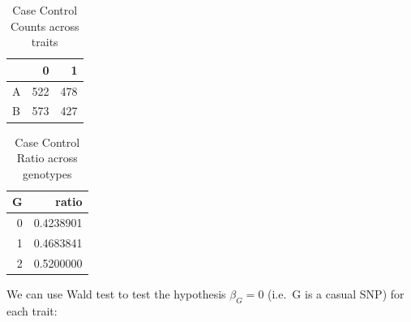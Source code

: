 \documentclass[
]{article}
\newenvironment{Shaded}{\begin{snugshade}}{\end{snugshade}}
\newcommand{\CommentTok}[1]{\textcolor[rgb]{0.56,0.35,0.01}{\textit{#1}}}
\newcommand{\DataTypeTok}[1]{\textcolor[rgb]{0.13,0.29,0.53}{#1}}
\newcommand{\DecValTok}[1]{\textcolor[rgb]{0.00,0.00,0.81}{#1}}
\newcommand{\KeywordTok}[1]{\textcolor[rgb]{0.13,0.29,0.53}{\textbf{#1}}}
\newcommand{\NormalTok}[1]{#1}
\newcommand{\OperatorTok}[1]{\textcolor[rgb]{0.81,0.36,0.00}{\textbf{#1}}}
\newcommand{\StringTok}[1]{\textcolor[rgb]{0.31,0.60,0.02}{#1}}
\begin{document}
\begin{table}[H]

\caption{\label{tab:simulatedData}Case Control Counts across traits}
\centering
\fontsize{10}{12}\selectfont
\begin{tabular}[t]{l|r|r}
\hline
  & 0 & 1\\
\hline
A & 522 & 478\\
\hline
B & 573 & 427\\
\hline
\end{tabular}
\end{table}

\begin{Shaded}
\end{Shaded}

\begin{table}[H]

\caption{\label{tab:simulatedData}Case Control Ratio across genotypes}
\centering
\fontsize{10}{12}\selectfont
\begin{tabular}[t]{r|r}
\hline
G & ratio\\
\hline
0 & 0.4238901\\
\hline
1 & 0.4683841\\
\hline
2 & 0.5200000\\
\hline
\end{tabular}
\end{table}

We can use Wald test to test the hypothesis \(\beta_G = 0\) (i.e.~G is a
casual SNP) for each trait:
\end{document}
